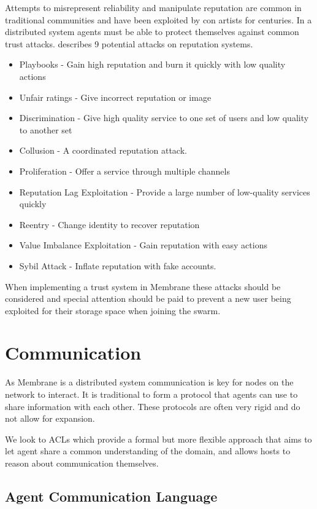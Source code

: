 \documentclass[11pt, a4paper, twoside]{report}
\begin{document}
Attempts to misrepresent reliability and manipulate reputation are common in traditional communities and have been exploited by con artists for centuries. In a distributed system agents must be able to protect themselves against common trust attacks. \cite{josang2009challenges} describes 9 potential attacks on reputation systems.

\begin{itemize}
 \item Playbooks - Gain high reputation and burn it quickly with low quality actions
 \item Unfair ratings - Give incorrect reputation or image
 \item Discrimination - Give high quality service to one set of users and low quality to another set
 \item Collusion - A coordinated reputation attack.
 \item Proliferation - Offer a service through multiple channels
 \item Reputation Lag Exploitation - Provide a large number of low-quality services quickly
 \item Reentry - Change identity to recover reputation
 \item Value Imbalance Exploitation - Gain reputation with easy actions
 \item Sybil Attack - Inflate reputation with fake accounts.
\end{itemize}

When implementing a trust system in Membrane these attacks should be considered and special attention should be paid to prevent a new user being exploited for their storage space when joining the swarm.

\section{Communication} \label{sec:comm}

As Membrane is a distributed system communication is key for nodes on the network to interact. It is traditional to form a protocol that agents can use to share information with each other. These protocols are often very rigid and do not allow for expansion.

We look to ACLs which provide a formal but more flexible approach that aims to let agent share a common understanding of the domain, and allows hosts to reason about communication themselves.

\subsection{Agent Communication Language}
\end{document}
